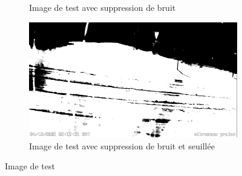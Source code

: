 \begin{figure}[H]
\begin{subfigure}{.45\textwidth}
        \caption{Image de test avec suppression de bruit}
        \label{fig:SnowOnRoad_test_denoised}
    \end{subfigure}
    \hfill
    \begin{subfigure}{.45\textwidth}
        \includegraphics[width=\linewidth]{Images/computer_vision/snowOnRoad/test_denoisedThres.png}
        \caption{Image de test avec suppression de bruit et seuillée}
        \label{fig:SnowOnRoad_test_denoisedThres}
    \end{subfigure}
    \caption[Images testées pour détection de neige sur route]{Image de test}
    \label{fig:SnowOnRoad_test}
\end{figure}
\newpage